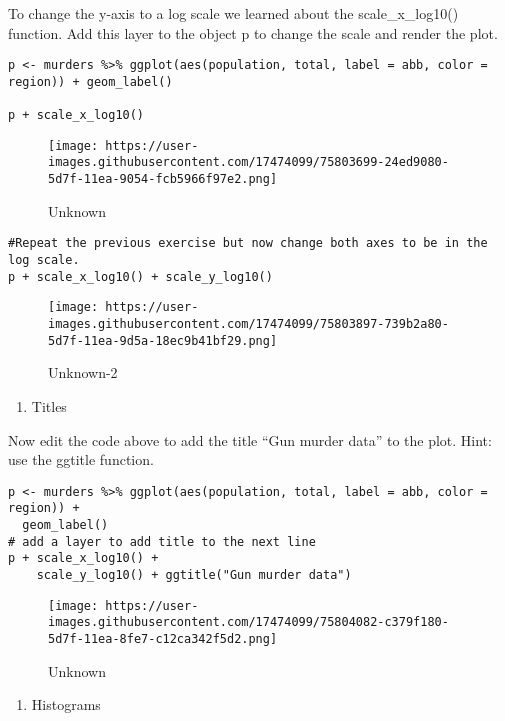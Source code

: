 \documentclass[]{article}
\providecommand{\tightlist}{%
  \setlength{\itemsep}{0pt}\setlength{\parskip}{0pt}}
\begin{document}
To change the y-axis to a log scale we learned about the
scale\_x\_log10() function. Add this layer to the object p to change the
scale and render the plot.

\begin{verbatim}
p <- murders %>% ggplot(aes(population, total, label = abb, color = region)) + geom_label()

p + scale_x_log10()
\end{verbatim}

\begin{figure}
\centering
\texttt{[image: https://user-images.githubusercontent.com/17474099/75803699-24ed9080-5d7f-11ea-9054-fcb5966f97e2.png]}
\caption{Unknown}
\end{figure}

\begin{verbatim}
#Repeat the previous exercise but now change both axes to be in the log scale.
p + scale_x_log10() + scale_y_log10()
\end{verbatim}

\begin{figure}
\centering
\texttt{[image: https://user-images.githubusercontent.com/17474099/75803897-739b2a80-5d7f-11ea-9d5a-18ec9b41bf29.png]}
\caption{Unknown-2}
\end{figure}

\begin{enumerate}
\def\labelenumi{\arabic{enumi}.}
\setcounter{enumi}{13}
\tightlist
\item
  Titles
\end{enumerate}

Now edit the code above to add the title ``Gun murder data'' to the
plot. Hint: use the ggtitle function.

\begin{verbatim}
p <- murders %>% ggplot(aes(population, total, label = abb, color = region)) +
  geom_label()
# add a layer to add title to the next line
p + scale_x_log10() + 
    scale_y_log10() + ggtitle("Gun murder data")
\end{verbatim}

\begin{figure}
\centering
\texttt{[image: https://user-images.githubusercontent.com/17474099/75804082-c379f180-5d7f-11ea-8fe7-c12ca342f5d2.png]}
\caption{Unknown}
\end{figure}

\begin{enumerate}
\def\labelenumi{\arabic{enumi}.}
\setcounter{enumi}{14}
\tightlist
\item
  Histograms
\end{enumerate}
\end{document}
